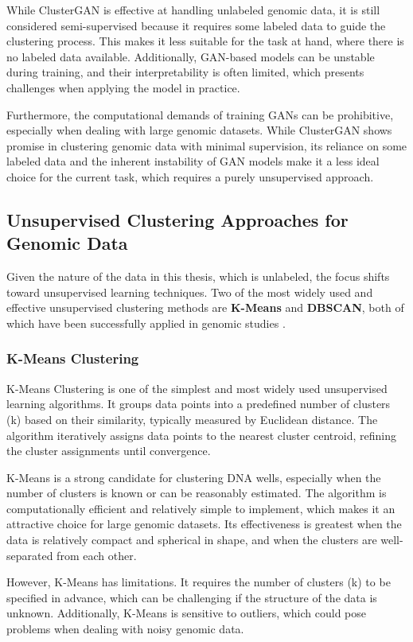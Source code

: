 While ClusterGAN is effective at handling unlabeled genomic data, it is still considered semi-supervised because it requires some labeled data to guide the clustering process. This makes it less suitable for the task at hand, where there is no labeled data available. Additionally, GAN-based models can be unstable during training, and their interpretability is often limited, which presents challenges when applying the model in practice.

Furthermore, the computational demands of training GANs can be prohibitive, especially when dealing with large genomic datasets. While ClusterGAN shows promise in clustering genomic data with minimal supervision, its reliance on some labeled data and the inherent instability of GAN models make it a less ideal choice for the current task, which requires a purely unsupervised approach.
\subsection{Unsupervised Clustering Approaches for Genomic Data}
Given the nature of the data in this thesis, which is unlabeled, the focus shifts toward unsupervised learning techniques. Two of the most widely used and effective unsupervised clustering methods are \textbf{K-Means} and \textbf{DBSCAN}, both of which have been successfully applied in genomic studies \cite{macqueen1967classification, ester1996density}.

\subsubsection{K-Means Clustering}
K-Means Clustering is one of the simplest and most widely used unsupervised learning algorithms. It groups data points into a predefined number of clusters (k) based on their similarity, typically measured by Euclidean distance. The algorithm iteratively assigns data points to the nearest cluster centroid, refining the cluster assignments until convergence.

K-Means is a strong candidate for clustering DNA wells, especially when the number of clusters is known or can be reasonably estimated. The algorithm is computationally efficient and relatively simple to implement, which makes it an attractive choice for large genomic datasets. Its effectiveness is greatest when the data is relatively compact and spherical in shape, and when the clusters are well-separated from each other.

However, K-Means has limitations. It requires the number of clusters (k) to be specified in advance, which can be challenging if the structure of the data is unknown. Additionally, K-Means is sensitive to outliers, which could pose problems when dealing with noisy genomic data.

